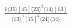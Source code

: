\documentclass[varwidth, border=5pt]{standalone}
\begin{document}
\begin{my}
$\begin{gathered}
\scriptscriptstyle\frac{1⟨35⟩[45]⟨23⟩^2⟨14⟩[13]}{⟨13⟩^3[15]^2⟨24⟩⟨34⟩}
\end{gathered}$
\end{my}
\end{document}
